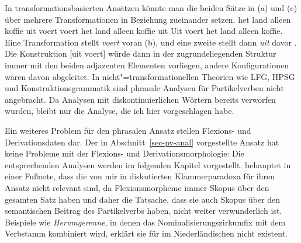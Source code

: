 %
In transformationsbasierten Ansätzen könnte man die beiden Sätze in (a) und (c)
über mehrere Transformationen in Beziehung zueinander setzen.
\eal
\ex het land alleen koffie uit voert
\ex voert het land alleen koffie uit
\ex Uit voert het land alleen koffie.
\zl
\largerpage
Eine Transformation stellt \emph{voert} voran (b), 
und eine zweite stellt dann \emph{uit} davor \citep[siehe z.\,B.][]{Koster75a}.
Die Konstruktion [uit voert] würde dann in der zugrundeliegenden Struktur
immer mit den beiden adjazenten Elementen vorliegen, andere Konfigurationen wären 
davon abgeleitet. In nicht"=transformationellen
Theorien wie LFG, HPSG und Konstruktionsgrammatik sind phrasale Analysen für Partikelverben
nicht angebracht. Da Analysen mit diskontinuierlichen Wörtern bereits verworfen wurden,
bleibt nur die Analyse, die ich hier vorgeschlagen habe.
%

Ein weiteres Problem für den phrasalen Ansatz stellen Flexions- und Derivationsdaten
dar. Der in Abschnitt~\ref{sec-pv-anal} vorgestellte Ansatz hat keine Probleme mit der Flexions- und Derivationsmorphologie:
Die entsprechenden Analysen werden im folgenden Kapitel vorgestellt. \citet[]{Blom2005a}
behauptet in einer Fußnote, dass die von mir in  diskutierten Klammerparadoxa
für ihren Ansatz nicht relevant sind, da Flexionsmorpheme immer Skopus über den gesamten
Satz haben und daher die Tatsache, dass sie auch Skopus über den semantischen Beitrag des
Partikelverbs haben, nicht weiter verwunderlich ist. Beispiele wie \emph{Herumgerenne}, 
in denen das Nominalisierungszirkumfix \gee mit dem Verbstamm kombiniert wird, erklärt
sie für im Niederländischen nicht existent.
\largerpage[2]

